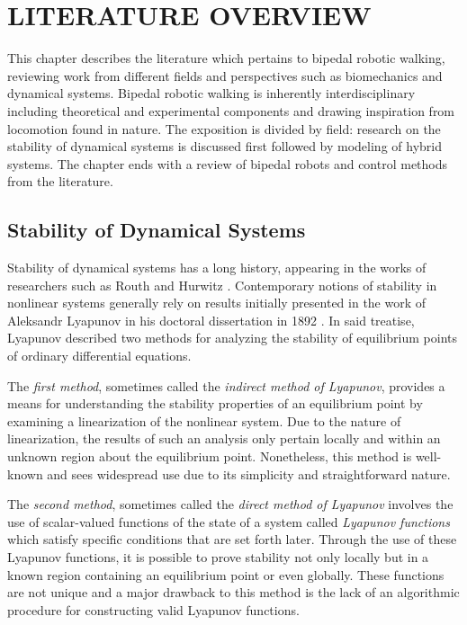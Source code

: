 \chapter{\uppercase{Literature Overview}}

This chapter describes the literature which pertains to bipedal robotic walking,
reviewing work from different fields and perspectives such as biomechanics and
dynamical systems.
%
Bipedal robotic walking is inherently interdisciplinary including theoretical
and experimental components and drawing inspiration from locomotion found in
nature.
%
The exposition is divided by field:
%
research on the stability of dynamical systems is discussed first followed by
modeling of hybrid systems.
%
The chapter ends with a review of bipedal robots and control methods from the
literature.

\section{Stability of Dynamical Systems} \label{sec:literature-stability}

Stability of dynamical systems has a long history, appearing in the works of
researchers such as Routh \cite{Routh1877} and Hurwitz \cite{Hurwitz1895}.
%
Contemporary notions of stability in nonlinear systems generally rely on results
initially presented in the work of Aleksandr Lyapunov in his doctoral
dissertation in 1892 \cite{Lyapunov1992}.
%
In said treatise, Lyapunov described two methods for analyzing the stability of
equilibrium points of ordinary differential equations.

The {\em first method}, sometimes called the {\em indirect method of Lyapunov},
provides a means for understanding the stability properties of an equilibrium
point by examining a linearization of the nonlinear system.
%
Due to the nature of linearization, the results of such an analysis only pertain
locally and within an unknown region about the equilibrium point.
%
Nonetheless, this method is well-known and sees widespread use due to its
simplicity and straightforward nature.
%

The {\em second method}, sometimes called the {\em direct method of Lyapunov}
involves the use of scalar-valued functions of the state of a system called {\em
  Lyapunov functions} which satisfy specific conditions that are set forth
later.
%
Through the use of these Lyapunov functions, it is possible to prove
stability not only locally but in a known region containing an equilibrium point
or even globally.
%
These functions are not unique and a major drawback to this method is the lack
of an algorithmic procedure for constructing valid Lyapunov functions.

